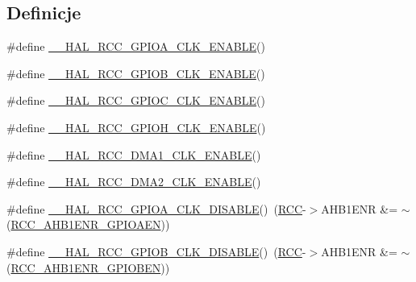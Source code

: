 \subsection*{Definicje}
\begin{DoxyCompactItemize}
\item 
\#define \hyperlink{group___r_c_c___a_h_b1___clock___enable___disable_ga1fde58d775fd2458002df817a68f486e}{\+\_\+\+\_\+\+H\+A\+L\+\_\+\+R\+C\+C\+\_\+\+G\+P\+I\+O\+A\+\_\+\+C\+L\+K\+\_\+\+E\+N\+A\+B\+LE}()
\item 
\#define \hyperlink{group___r_c_c___a_h_b1___clock___enable___disable_ga5ad43f3f4d8163d40f7d402ef75d27c5}{\+\_\+\+\_\+\+H\+A\+L\+\_\+\+R\+C\+C\+\_\+\+G\+P\+I\+O\+B\+\_\+\+C\+L\+K\+\_\+\+E\+N\+A\+B\+LE}()
\item 
\#define \hyperlink{group___r_c_c___a_h_b1___clock___enable___disable_ga5ebfeb136612f370950f52306d29b6fd}{\+\_\+\+\_\+\+H\+A\+L\+\_\+\+R\+C\+C\+\_\+\+G\+P\+I\+O\+C\+\_\+\+C\+L\+K\+\_\+\+E\+N\+A\+B\+LE}()
\item 
\#define \hyperlink{group___r_c_c___a_h_b1___clock___enable___disable_ga041e72359b94f19569e774030fc6ebff}{\+\_\+\+\_\+\+H\+A\+L\+\_\+\+R\+C\+C\+\_\+\+G\+P\+I\+O\+H\+\_\+\+C\+L\+K\+\_\+\+E\+N\+A\+B\+LE}()
\item 
\#define \hyperlink{group___r_c_c___a_h_b1___clock___enable___disable_ga49fc2c82ba0753e462ea8eb91c634a98}{\+\_\+\+\_\+\+H\+A\+L\+\_\+\+R\+C\+C\+\_\+\+D\+M\+A1\+\_\+\+C\+L\+K\+\_\+\+E\+N\+A\+B\+LE}()
\item 
\#define \hyperlink{group___r_c_c___a_h_b1___clock___enable___disable_ga1b5c4bd52d8e7c70e105dd415a191afd}{\+\_\+\+\_\+\+H\+A\+L\+\_\+\+R\+C\+C\+\_\+\+D\+M\+A2\+\_\+\+C\+L\+K\+\_\+\+E\+N\+A\+B\+LE}()
\item 
\#define \hyperlink{group___r_c_c___a_h_b1___clock___enable___disable_ga7083e491e6a1e165d064d199304bd2f0}{\+\_\+\+\_\+\+H\+A\+L\+\_\+\+R\+C\+C\+\_\+\+G\+P\+I\+O\+A\+\_\+\+C\+L\+K\+\_\+\+D\+I\+S\+A\+B\+LE}()~(\hyperlink{group___peripheral__declaration_ga74944438a086975793d26ae48d5882d4}{R\+CC}-\/$>$A\+H\+B1\+E\+NR \&= $\sim$(\hyperlink{group___peripheral___registers___bits___definition_ga6ff46fb3b30fc6792e4fd18fcb0941b5}{R\+C\+C\+\_\+\+A\+H\+B1\+E\+N\+R\+\_\+\+G\+P\+I\+O\+A\+EN}))
\item 
\#define \hyperlink{group___r_c_c___a_h_b1___clock___enable___disable_ga60be1be419b57dafbbb93df67d68a424}{\+\_\+\+\_\+\+H\+A\+L\+\_\+\+R\+C\+C\+\_\+\+G\+P\+I\+O\+B\+\_\+\+C\+L\+K\+\_\+\+D\+I\+S\+A\+B\+LE}()~(\hyperlink{group___peripheral__declaration_ga74944438a086975793d26ae48d5882d4}{R\+CC}-\/$>$A\+H\+B1\+E\+NR \&= $\sim$(\hyperlink{group___peripheral___registers___bits___definition_gad7f408f92e7fd49b0957b8cb4ff31ca5}{R\+C\+C\+\_\+\+A\+H\+B1\+E\+N\+R\+\_\+\+G\+P\+I\+O\+B\+EN}))

\end{DoxyCompactItemize}
